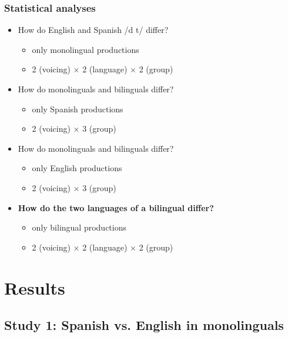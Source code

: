 \documentclass{beamer}
\begin{document}
\begin{frame}
\frametitle{Statistical analyses}
\begin{itemize}
	\item How do English and Spanish /d t/ differ?
	\begin{itemize}
		\item only monolingual productions
		\item 2 (voicing) $\times$ 2 (language) $\times$ 2 (group)
	\end{itemize}
	\item How do monolinguals and bilinguals differ?
	\begin{itemize}
		\item only Spanish productions
		\item 2 (voicing) $\times$ 3 (group)
	\end{itemize}
	\item How do monolinguals and bilinguals differ?
	\begin{itemize}
		\item only English productions
		\item 2 (voicing) $\times$ 3 (group)
	\end{itemize}
	\item \textbf{How do the two languages of a bilingual differ?}
	\begin{itemize}
		\item only bilingual productions
		\item 2 (voicing) $\times$ 2 (language) $\times$ 2 (group)
	\end{itemize}
\end{itemize}
\end{frame}


\section{Results} %
\label{sec:results}


\subsection{Study 1: Spanish vs. English  in monolinguals}

\end{document}
